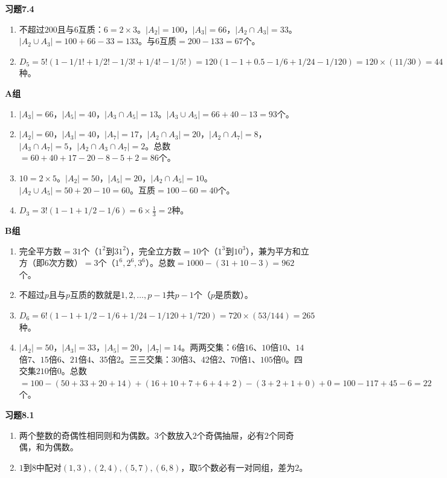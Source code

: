 \textbf{习题7.4}
\begin{enumerate}
\item 不超过$200$且与$6$互质：$6=2\times3$。$|A_2|=100$，$|A_3|=66$，$|A_2\cap A_3|=33$。$|A_2\cup A_3|=100+66-33=133$。与$6$互质$=200-133=67$个。
\item $D_5=5!(1-1/1!+1/2!-1/3!+1/4!-1/5!)=120(1-1+0.5-1/6+1/24-1/120)=120\times(11/30)=44$种。
\end{enumerate}

\textbf{A组}
\begin{enumerate}
\item $|A_3|=66$，$|A_5|=40$，$|A_3\cap A_5|=13$。$|A_3\cup A_5|=66+40-13=93$个。
\item $|A_2|=60$，$|A_3|=40$，$|A_7|=17$，$|A_2\cap A_3|=20$，$|A_2\cap A_7|=8$，$|A_3\cap A_7|=5$，$|A_2\cap A_3\cap A_7|=2$。总数$=60+40+17-20-8-5+2=86$个。
\item $10=2\times5$。$|A_2|=50$，$|A_5|=20$，$|A_2\cap A_5|=10$。$|A_2\cup A_5|=50+20-10=60$。互质$=100-60=40$个。
\item $D_3=3!(1-1+1/2-1/6)=6\times\frac13=2$种。
\end{enumerate}

\textbf{B组}
\begin{enumerate}
\item 完全平方数$=31$个（$1^2$到$31^2$），完全立方数$=10$个（$1^3$到$10^3$），兼为平方和立方（即$6$次方数）$=3$个（$1^6,2^6,3^6$）。总数$=1000-(31+10-3)=962$个。
\item 不超过$p$且与$p$互质的数就是$1,2,\dots,p-1$共$p-1$个（$p$是质数）。
\item $D_6=6!(1-1+1/2-1/6+1/24-1/120+1/720)=720\times(53/144)=265$种。
\item $|A_2|=50$，$|A_3|=33$，$|A_5|=20$，$|A_7|=14$。两两交集：$6$倍$16$、$10$倍$10$、$14$倍$7$、$15$倍$6$、$21$倍$4$、$35$倍$2$。三三交集：$30$倍$3$、$42$倍$2$、$70$倍$1$、$105$倍$0$。四交集$210$倍$0$。总数$=100-(50+33+20+14)+(16+10+7+6+4+2)-(3+2+1+0)+0=100-117+45-6=22$个。
\end{enumerate}


\textbf{习题8.1}
\begin{enumerate}
\item 两个整数的奇偶性相同则和为偶数。$3$个数放入$2$个奇偶抽屉，必有$2$个同奇偶，和为偶数。
\item $1$到$8$中配对$(1,3),(2,4),(5,7),(6,8)$，取$5$个数必有一对同组，差为$2$。
\end{enumerate}


